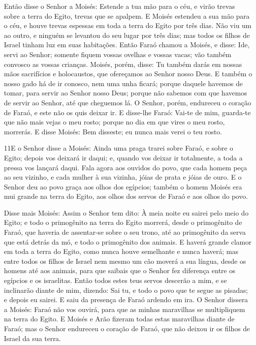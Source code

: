 Então disse o Senhor a Moisés: Estende a tua mão para o céu, e
virão trevas sobre a terra do Egito, trevas que se apalpem. E
Moisés estendeu a sua mão para o céu, e houve trevas espessas em
toda a terra do Egito por três dias. Não viu um ao outro, e
ninguém se levantou do seu lugar por três dias; mas todos os filhos
de Israel tinham luz em suas habitações. Então Faraó chamou a
Moisés, e disse: Ide, servi ao Senhor; somente fiquem vossas ovelhas
e vossas vacas; vão também convosco as vossas crianças.
Moisés, porém, disse: Tu também darás em nossas mãos
sacrifícios e holocaustos, que ofereçamos ao Senhor nosso Deus.
E também o nosso gado há de ir conosco, nem uma unha ficará;
porque daquele havemos de tomar, para servir ao Senhor nosso Deus;
porque não sabemos com que havemos de servir ao Senhor, até que
cheguemos lá. O Senhor, porém, endureceu o coração de Faraó,
e este não os quis deixar ir. E disse-lhe Faraó: Vai-te de
mim, guarda-te que não mais vejas o meu rosto; porque no dia em que
vires o meu rosto, morrerás. E disse Moisés: Bem disseste; eu
nunca mais verei o teu rosto.

\medskip

\lettrine{11} E o Senhor disse a Moisés: Ainda uma praga
trarei sobre Faraó, e sobre o Egito; depois vos deixará ir daqui; e,
quando vos deixar ir totalmente, a toda a pressa vos lançará daqui.
Fala agora aos ouvidos do povo, que cada homem peça ao seu
vizinho, e cada mulher à sua vizinha, jóias de prata e jóias de
ouro. E o Senhor deu ao povo graça aos olhos dos egípcios;
também o homem Moisés era mui grande na terra do Egito, aos olhos
dos servos de Faraó e aos olhos do povo.

Disse mais Moisés: Assim o Senhor tem dito: À meia noite eu sairei
pelo meio do Egito; e todo o primogênito na terra do Egito
morrerá, desde o primogênito de Faraó, que haveria de assentar-se
sobre o seu trono, até ao primogênito da serva que está detrás da
mó, e todo o primogênito dos animais. E haverá grande clamor em
toda a terra do Egito, como nunca houve semelhante e nunca haverá;
mas entre todos os filhos de Israel nem mesmo um cão moverá a
sua língua, desde os homens até aos animais, para que saibais que o
Senhor fez diferença entre os egípcios e os israelitas. Então
todos estes teus servos descerão a mim, e se inclinarão diante de
mim, dizendo: Sai tu, e todo o povo que te segue as pisadas; e
depois eu sairei. E saiu da presença de Faraó ardendo em ira. O
Senhor dissera a Moisés: Faraó não vos ouvirá, para que as minhas
maravilhas se multipliquem na terra do Egito. E Moisés e Arão
fizeram todas estas maravilhas diante de Faraó; mas o Senhor
endureceu o coração de Faraó, que não deixou ir os filhos de Israel
da sua terra.

